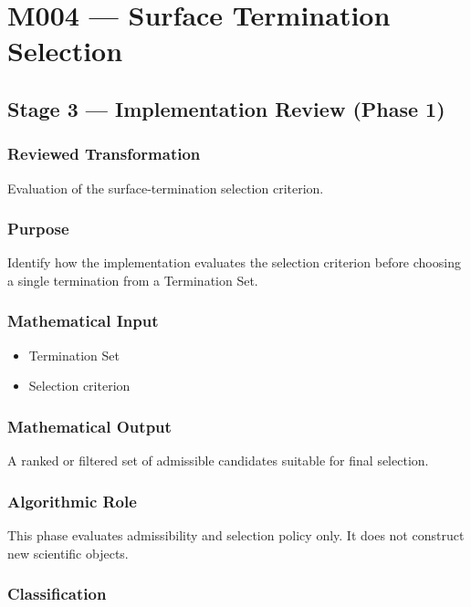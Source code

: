 \chapter{M004 --- Surface Termination Selection}

\section{Stage 3 --- Implementation Review (Phase 1)}

\subsection{Reviewed Transformation}

Evaluation of the surface-termination selection criterion.

\subsection{Purpose}

Identify how the implementation evaluates the selection criterion before
choosing a single termination from a Termination Set.

\subsection{Mathematical Input}

\begin{itemize}
\item Termination Set
\item Selection criterion
\end{itemize}

\subsection{Mathematical Output}

A ranked or filtered set of admissible candidates suitable for final
selection.

\subsection{Algorithmic Role}

This phase evaluates admissibility and selection policy only. It does
not construct new scientific objects.

\subsection{Classification}


